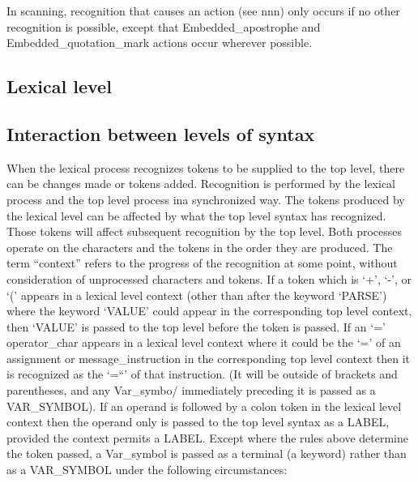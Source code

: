 In scanning, recognition that causes an action (see nnn) only occurs if
no other recognition is possible, except that Embedded\_apostrophe and
Embedded\_quotation\_mark actions occur wherever possible.

\subsection{Lexical level}\label{lexical-level}

\subsection{Interaction between levels of
syntax}\label{interaction-between-levels-of-syntax}

When the lexical process recognizes tokens to be supplied to the top
level, there can be changes made or tokens added. Recognition is
performed by the lexical process and the top level process ina
synchronized way. The tokens produced by the lexical level can be
affected by what the top level syntax has recognized. Those tokens will
affect subsequent recognition by the top level. Both processes operate
on the characters and the tokens in the order they are produced. The
term ``context'' refers to the progress of the recognition at some
point, without consideration of unprocessed characters and tokens. If a
token which is `+', `-', \textquotesingle{} or `(' appears in a lexical
level context (other than after the keyword `PARSE') where the keyword
`VALUE' could appear in the corresponding top level context, then
`VALUE' is passed to the top level before the token is passed. If an `='
operator\_char appears in a lexical level context where it could be the
`=' of an assignment or message\_instruction in the corresponding top
level context then it is recognized as the `=``' of that instruction.
(It will be outside of brackets and parentheses, and any Var\_symbo/
immediately preceding it is passed as a VAR\_SYMBOL). If an operand is
followed by a colon token in the lexical level context then the operand
only is passed to the top level syntax as a LABEL, provided the context
permits a LABEL. Except where the rules above determine the token
passed, a Var\_symbol is passed as a terminal (a keyword) rather than as
a VAR\_SYMBOL under the following circumstances:

